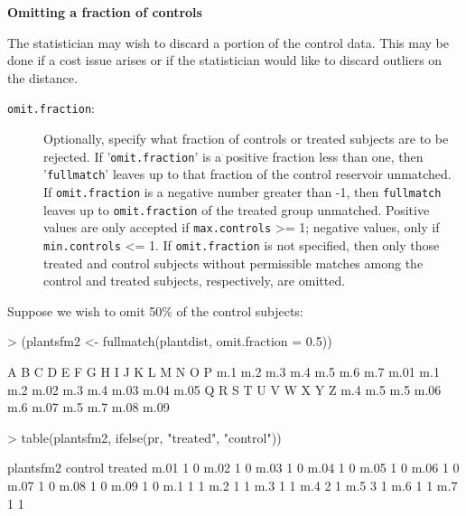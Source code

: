 \documentclass[12pt,twoside]{article}
\begin{document}
{{{{\rmfamily\bfseries
Omitting a fraction of controls}


\bigskip

{\ttfamily
\textrm{ The statistician may wish to discard a portion of the control
data. This may be done if a cost issue arises or if the statistician
would like to discard outliers on the distance.}}


\bigskip

\begin{description}
\item[\texttt{omit.fraction}:] 
Optionally, specify what fraction of controls or treated subjects
are to be rejected.  If '\texttt{omit.fraction}' is a positive 
fraction less than one, then '\texttt{fullmatch}' leaves up 
to that fraction of the control reservoir unmatched.
If \texttt{omit.fraction} is
a negative number greater than {}-1, then \texttt{fullmatch} leaves
up to
{\textbar}\texttt{omit.fraction}{\textbar}
of the treated group unmatched. Positive values are only accepted
if \texttt{max.controls}
{\textgreater}= 1; negative values, only if
\texttt{min.controls} \textless= 1.  If
\texttt{omit.fraction} is not specified, then only those 
treated and control subjects without permissible
matches among the control and treated subjects,
respectively, are omitted.
\end{description}


\bigskip

{\rmfamily
Suppose we wish to omit 50\% of the control subjects: }


\bigskip

\begin{Schunk}
\begin{Sinput}
> (plantsfm2 <- fullmatch(plantdist, omit.fraction = 0.5))
\end{Sinput}
\begin{Soutput}
   A    B    C    D    E    F    G    H    I    J    K    L    M    N    O    P 
 m.1  m.2  m.3  m.4  m.5  m.6  m.7 m.01  m.1  m.2 m.02  m.3  m.4 m.03 m.04 m.05 
   Q    R    S    T    U    V    W    X    Y    Z 
 m.4  m.5  m.5 m.06  m.6 m.07  m.5  m.7 m.08 m.09 
\end{Soutput}
\begin{Sinput}
> table(plantsfm2, ifelse(pr, "treated", "control"))
\end{Sinput}
\begin{Soutput}
plantsfm2 control treated
     m.01       1       0
     m.02       1       0
     m.03       1       0
     m.04       1       0
     m.05       1       0
     m.06       1       0
     m.07       1       0
     m.08       1       0
     m.09       1       0
     m.1        1       1
     m.2        1       1
     m.3        1       1
     m.4        2       1
     m.5        3       1
     m.6        1       1
     m.7        1       1
\end{Soutput}
\end{Schunk}

}}}
\end{document}
